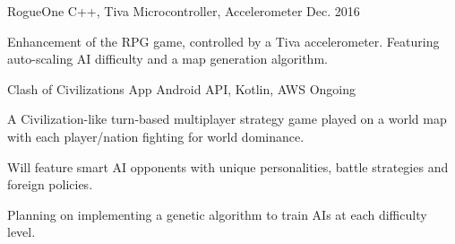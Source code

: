 \begin{cventries}
  \cvproject
    {} %
    {RogueOne \href{https://github.com/jsun98/RogueOne}{\faGithub\acvHeaderIconSep}
    \tiny C++, Tiva Microcontroller, Accelerometer} %
    {} %
    {Dec. 2016} %
    {
      \begin{cvitems} %
        \item {Enhancement of the RPG game, controlled by a Tiva accelerometer. Featuring auto-scaling AI difficulty and a map generation algorithm.}
      \end{cvitems}
    }



  \cvproject
    {} %
    {Clash of Civilizations App \tiny Android API, Kotlin, AWS} %
    {} %
    {Ongoing} %
    {
      \begin{cvitems} %
        \item {A Civilization-like turn-based multiplayer strategy game played on a world map with each player/nation fighting for world dominance.}
        \item {Will feature smart AI opponents with unique personalities, battle strategies and foreign policies.}
         \item {Planning on implementing a genetic algorithm to train AIs at each difficulty level.}
      \end{cvitems}
    }



\end{cventries}